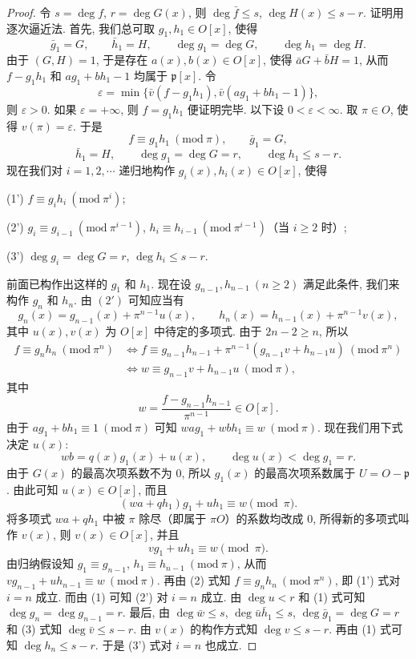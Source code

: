 \begin{proof}
令 $s=\deg f$, $r=\deg G(x)$, 则 $\deg\bar{f}\leqslant s$, $\deg H(x)\leqslant s-r$. 证明用逐次逼近法. 首先, 我们总可取 $g_1,h_1\in O[x]$, 使得
\[
  \bar{g}_1=G,\qquad\bar{h}_1=H,\qquad\deg g_1=\deg G,\qquad\deg h_1=\deg H.
\]
由于 $(G,H)=1$, 于是存在 $a(x),b(x)\in O[x]$, 使得 $\bar{a}G+\bar{b}H=1$, 从而 $f-g_1h_1$ 和 $ag_1+bh_1-1$ 均属于 $\mathfrak{p}[x]$. 令
\[
  \varepsilon=\min\{\bar{v}(f-g_1h_1),\bar{v}(ag_1+bh_1-1)\},
\]
则 $\varepsilon>0$. 如果 $\varepsilon=+\infty$, 则 $f=g_1h_1$ 便证明完毕. 以下设 $0<\varepsilon<\infty$. 取 $\pi\in O$, 使得 $v(\pi)=\varepsilon$. 于是
\[
  f\equiv g_1h_1\ (\mathrm{mod}\ \pi),\qquad\bar{g}_1=G,
\]
\[
  \bar{h}_1=H,\qquad\deg g_1=\deg G=r,\qquad\deg h_1\leqslant s-r.
\]
现在我们对 $i=1,2,\cdots$ 递归地构作 $g_i(x),h_i(x)\in O[x]$, 使得

(1') $f\equiv g_ih_i\ (\mathrm{mod}\ \pi^i)$;

(2') $g_i\equiv g_{i-1}\ (\mathrm{mod}\ \pi^{i-1})$, $h_i\equiv h_{i-1}\ (\mathrm{mod}\ \pi^{i-1})$（当 $i\geqslant 2$ 时）;

(3') $\deg g_i=\deg G=r$, $\deg h_i\leqslant s-r$.

前面已构作出这样的 $g_1$ 和 $h_1$. 现在设 $g_{n-1},h_{n-1}\ (n\geqslant 2)$ 满足此条件, 我们来构作 $g_n$ 和 $h_n$. 由 $(2')$ 可知应当有
\begin{equation}\tag{1}
  g_n(x)=g_{n-1}(x)+\pi^{n-1}u(x),\qquad
  h_n(x)=h_{n-1}(x)+\pi^{n-1}v(x),
\end{equation}
其中 $u(x),v(x)$ 为 $O[x]$ 中待定的多项式. 由于 $2n-2\geqslant n$, 所以
\begin{equation}\tag{2}
  \begin{aligned}
    f\equiv g_nh_n\ (\mathrm{mod}\ \pi^n)&\Leftrightarrow
    f\equiv g_{n-1}h_{n-1}+\pi^{n-1}(g_{n-1}v+h_{n-1}u)\ (\mathrm{mod}\ \pi^n)\\
    &\Leftrightarrow w\equiv g_{n-1}v+h_{n-1}u\ (\mathrm{mod}\ \pi),
  \end{aligned}
\end{equation}
其中
\[
  w=\frac{f-g_{n-1}h_{n-1}}{\pi^{n-1}}\in O[x].
\]
由于 $ag_1+bh_1\equiv 1\ (\mathrm{mod}\ \pi)$ 可知 $wag_1+wbh_1\equiv w\ (\mathrm{mod}\ \pi)$. 现在我们用下式决定 $u(x)$:
\[
  wb=q(x)g_1(x)+u(x),\qquad\deg u(x)<\deg g_1=r.
\]
由于 $G(x)$ 的最高次项系数不为 $0$, 所以 $g_1(x)$ 的最高次项系数属于 $U=O-\mathfrak{p}$. 由此可知 $u(x)\in O[x]$, 而且
\[
  (wa+qh_1)g_1+uh_1\equiv w\pmod{\pi}.
\]
将多项式 $wa+qh_1$ 中被 $\pi$ 除尽（即属于 $\pi O$）的系数均改成 $0$, 所得新的多项式叫作 $v(x)$, 则 $v(x)\in O[x]$, 并且
\begin{equation}\tag{3}
  vg_1+uh_1\equiv w\pmod{\pi}.
\end{equation}
由归纳假设知 $g_1\equiv g_{n-1}$, $h_1\equiv h_{n-1}\ (\mathrm{mod}\ \pi)$, 从而 $vg_{n-1}+uh_{n-1}\equiv w\ (\mathrm{mod}\ \pi)$. 再由 (2) 式知 $f\equiv g_nh_n\ (\mathrm{mod}\ \pi^n)$, 即 (1') 式对 $i=n$ 成立. 而由 (1) 可知 (2') 对 $i=n$ 成立. 由 $\deg u<r$ 和 (1) 式可知 $\deg g_n=\deg g_{n-1}=r$. 最后, 由 $\deg\bar{w}\leqslant s$, $\deg\bar{u}\bar{h}_1\leqslant s$, $\deg\bar{g}_1=\deg G=r$ 和 (3) 式知 $\deg\bar{v}\leqslant s-r$. 由 $v(x)$ 的构作方式知 $\deg v\leqslant s-r$. 再由 (1) 式可知 $\deg h_n\leqslant s-r$. 于是 (3') 式对 $i=n$ 也成立.


\end{proof}
